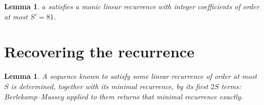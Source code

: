 \documentclass[11pt,a4paper]{article}
\theoremstyle{plain}
\newtheorem{lemma}[theorem]{Lemma}
\theoremstyle{definition}
\begin{document}
\begin{lemma}\label{lem:cf}
$a$ satisfies a monic linear recurrence with integer coefficients of order at most
$S'=81$.
\end{lemma}

\section{Recovering the recurrence}

\begin{lemma}\label{lem:bm}
A sequence known to satisfy some linear recurrence of order at most $S$ is determined, together
with its minimal recurrence, by its first $2S$ terms: Berlekamp--Massey applied to them returns
that minimal recurrence exactly.
\end{lemma}
\end{document}
